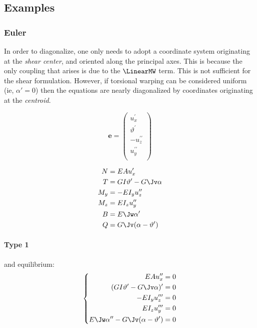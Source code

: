 \subsection{Examples}

\subsubsection{Euler}

In order to diagonalize, one only needs to adopt a coordinate system originating at the \emph{shear center}, and oriented along the principal axes. This is because the only coupling that arises is due to the \(\LinearMW\) term.
%
This is not sufficient for the shear formulation. However, if torsional warping can be considered uniform (ie, \(\alpha' = 0\)) then the equations are nearly diagonalized by coordinates originating at the \emph{centroid}.

\begin{equation*}
\bm{e} = \begin{pmatrix} 
u_{x}^{\prime} \\ \hline
\vartheta^{\prime} \\ 
-u_z^{\prime\prime} \\ 
 u_y^{\prime\prime} \\
\end{pmatrix} 
\end{equation*}


\begin{equation*}
\begin{aligned}
N &= EA u_{x}^{\prime} \\ 
T &= G I \vartheta^{\prime} - G \Jv \alpha \\ 
M_y &= -EI_y u_z^{\prime\prime} \\ 
M_z &=  EI_z u_y^{\prime\prime} \\
B   &= E \Jw \alpha' \\
Q   &= G \Jv ( \alpha - \vartheta' )\\
\end{aligned} 
\end{equation*}


\paragraph{Type 1}

and equilibrium:
\begin{equation*}
\left\{\begin{aligned}
EA u_{x}'' &= 0 \\ 
(GI \vartheta' - G \Jv  \alpha)'  &= 0 \\ 
-EI_y u_z'''  &= 0 \\ 
 EI_z u_y'''  &= 0 \\
E \Jw \alpha'' - G \Jv  ( \alpha - \vartheta' ) &= 0 
\end{aligned}\right.
\end{equation*}


